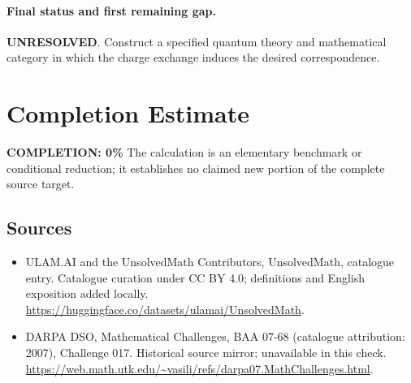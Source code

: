 \documentclass[11pt]{article}
\begin{document}
\paragraph{Final status and first remaining gap.}
\textbf{UNRESOLVED}. Construct a specified quantum theory and mathematical category in which the charge exchange induces the desired correspondence.

\section{Completion Estimate}
\noindent\textbf{COMPLETION: 0\%}
The calculation is an elementary benchmark or conditional reduction; it establishes no claimed new portion of the complete source target.

\subsection{Sources}
\begin{itemize}
\item[\hypertarget{source:statement:1}{S1}] ULAM.AI and the UnsolvedMath Contributors, UnsolvedMath, catalogue entry. Catalogue curation under CC BY 4.0; definitions and English exposition added locally.
\url{https://huggingface.co/datasets/ulamai/UnsolvedMath}.
\item[\hypertarget{source:statement:2}{S2}] DARPA DSO, Mathematical Challenges, BAA 07-68 (catalogue attribution: 2007), Challenge 017. Historical source mirror; unavailable in this check.
\url{https://web.math.utk.edu/~vasili/refs/darpa07.MathChallenges.html}.
\end{itemize}
\label{end:statement}
\end{document}
